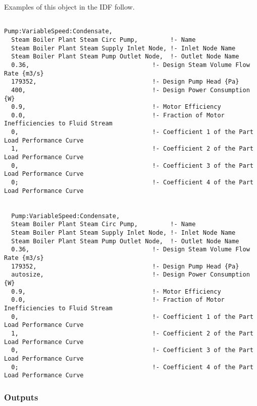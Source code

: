 Examples of this object in the IDF follow.

\begin{lstlisting}

Pump:VariableSpeed:Condensate,
  Steam Boiler Plant Steam Circ Pump,         !- Name
  Steam Boiler Plant Steam Supply Inlet Node, !- Inlet Node Name
  Steam Boiler Plant Steam Pump Outlet Node,  !- Outlet Node Name
  0.36,                                  !- Design Steam Volume Flow Rate {m3/s}
  179352,                                !- Design Pump Head {Pa}
  400,                                   !- Design Power Consumption {W}
  0.9,                                   !- Motor Efficiency
  0.0,                                   !- Fraction of Motor Inefficiencies to Fluid Stream
  0,                                     !- Coefficient 1 of the Part Load Performance Curve
  1,                                     !- Coefficient 2 of the Part Load Performance Curve
  0,                                     !- Coefficient 3 of the Part Load Performance Curve
  0;                                     !- Coefficient 4 of the Part Load Performance Curve


  Pump:VariableSpeed:Condensate,
  Steam Boiler Plant Steam Circ Pump,         !- Name
  Steam Boiler Plant Steam Supply Inlet Node, !- Inlet Node Name
  Steam Boiler Plant Steam Pump Outlet Node,  !- Outlet Node Name
  0.36,                                  !- Design Steam Volume Flow Rate {m3/s}
  179352,                                !- Design Pump Head {Pa}
  autosize,                              !- Design Power Consumption {W}
  0.9,                                   !- Motor Efficiency
  0.0,                                   !- Fraction of Motor Inefficiencies to Fluid Stream
  0,                                     !- Coefficient 1 of the Part Load Performance Curve
  1,                                     !- Coefficient 2 of the Part Load Performance Curve
  0,                                     !- Coefficient 3 of the Part Load Performance Curve
  0;                                     !- Coefficient 4 of the Part Load Performance Curve
\end{lstlisting}

\subsubsection{Outputs}\label{outputs-2-016}

